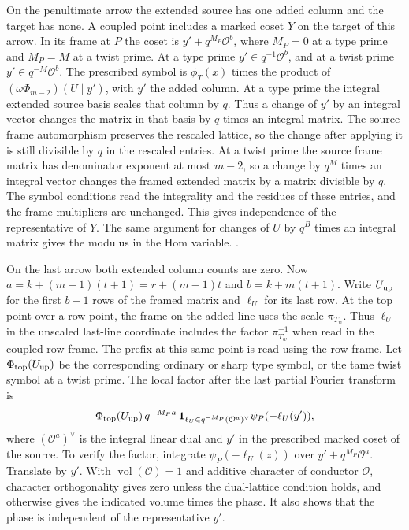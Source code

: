 On the penultimate arrow the extended source has one added
column and the target has none. A coupled point includes a
marked coset \(Y\) on the target of this arrow. In its frame
at \(P\) the coset is \(y'+q^{M_P}\mathcal O^b\), where
\(M_P=0\) at a type prime and \(M_P=M\) at a twist prime.
At a type prime \(y'\in q^{-1}\mathcal O^b\), and at a twist
prime \(y'\in q^{-M}\mathcal O^b\).
The prescribed symbol is \(\phi_T(x)\) times the product of
\((\omega\Phi_{m-2})(U\mid y')\), with \(y'\) the added column.
At a type prime the integral extended source basis scales
that column by \(q\). Thus a change of \(y'\) by an integral
vector changes the matrix in that basis by \(q\) times an
integral matrix. The source frame automorphism preserves
the rescaled lattice, so the change after applying it is
still divisible by \(q\) in the rescaled entries. At a twist
prime the source frame matrix has denominator exponent at
most \(m-2\), so a change by \(q^M\) times an integral
vector changes the framed extended matrix by a matrix
divisible by \(q\). The symbol conditions read the
integrality and the residues of these entries, and the
frame multipliers are unchanged. This gives independence
of the representative of \(Y\). The same argument for
changes of \(U\) by \(q^B\) times an integral matrix gives
the modulus in the Hom variable.
.

On the last arrow both extended column counts are zero.
Now \(a=k+(m-1)(t+1)=r+(m-1)t\) and \(b=k+m(t+1)\).
Write \(U_{\rm up}\) for the first \(b-1\) rows of the
framed matrix and \(\ell_U\) for its last row.
At the top point over a row point, the frame on the added
line uses the scale \(\pi_{T_w}\). Thus \(\ell_U\) in the
unscaled last-line coordinate includes the factor
\(\pi_{T_w}^{-1}\) when read in the coupled row frame.
The prefix at this same point is read using the row frame.
Let \(\Phi_{\rm top}(U_{\rm up})\) be the corresponding
ordinary or sharp type symbol, or the tame twist symbol
at a twist prime. The local factor after the last partial
Fourier transform is
\[
 \Phi_{\rm top}(U_{\rm up})\,
 q^{-M_P a}\,
 \mathbf 1_{\ell_U\in q^{-M_P}(\mathcal O^a)^\vee}
 \psi_P(-\ell_U(y')) ,
\]
where \((\mathcal O^a)^\vee\) is the integral linear dual and \(y'\)
in the prescribed marked coset of the source. To verify the
factor, integrate \(\psi_P(-\ell_U(z))\) over
\(y'+q^{M_P}\mathcal O^a\). Translate by \(y'\). With
\(\operatorname{vol}(\mathcal O)=1\) and additive character of
conductor \(\mathcal O\), character orthogonality gives zero
unless the dual-lattice condition holds, and otherwise gives
the indicated volume times the phase. It also shows that the
phase is independent of the representative \(y'\).

